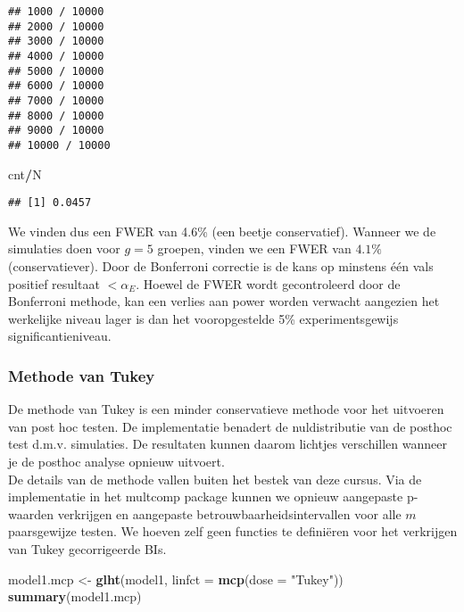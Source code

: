 \documentclass[
  12pt,dutch,coursenotes]{book}
\newenvironment{Shaded}{\begin{snugshade}}{\end{snugshade}}
\newcommand{\DataTypeTok}[1]{\textcolor[rgb]{0.13,0.29,0.53}{#1}}
\newcommand{\KeywordTok}[1]{\textcolor[rgb]{0.13,0.29,0.53}{\textbf{#1}}}
\newcommand{\NormalTok}[1]{#1}
\newcommand{\OperatorTok}[1]{\textcolor[rgb]{0.81,0.36,0.00}{\textbf{#1}}}
\newcommand{\StringTok}[1]{\textcolor[rgb]{0.31,0.60,0.02}{#1}}
\theoremstyle{definition}
\theoremstyle{definition}
\theoremstyle{definition}
\theoremstyle{remark}
\begin{document}
\begin{verbatim}
## 1000 / 10000 
## 2000 / 10000 
## 3000 / 10000 
## 4000 / 10000 
## 5000 / 10000 
## 6000 / 10000 
## 7000 / 10000 
## 8000 / 10000 
## 9000 / 10000 
## 10000 / 10000
\end{verbatim}

\begin{Shaded}
\begin{Highlighting}[]
\NormalTok{cnt}\OperatorTok{/}\NormalTok{N}
\end{Highlighting}
\end{Shaded}

\begin{verbatim}
## [1] 0.0457
\end{verbatim}

We vinden dus een FWER van 4.6\% (een beetje conservatief). Wanneer we de simulaties doen voor \(g=5\) groepen, vinden we een FWER van \(4.1\%\) (conservatiever). Door de Bonferroni correctie is de kans op minstens één vals positief resultaat \(< \alpha_E\). Hoewel de FWER wordt gecontroleerd door de Bonferroni methode, kan een verlies aan power worden verwacht aangezien het werkelijke niveau lager is dan het vooropgestelde 5\% experimentsgewijs significantieniveau.

\hypertarget{methode-van-tukey}{%
\subsubsection{Methode van Tukey}\label{methode-van-tukey}}

De methode van Tukey is een minder conservatieve methode voor het uitvoeren van post hoc testen.
De implementatie benadert de nuldistributie van de posthoc test d.m.v. simulaties.
De resultaten kunnen daarom lichtjes verschillen wanneer je de posthoc analyse opnieuw uitvoert.\\
De details van de methode vallen buiten het bestek van deze cursus.
Via de implementatie in het multcomp package kunnen we opnieuw aangepaste p-waarden verkrijgen en aangepaste betrouwbaarheidsintervallen voor alle \(m\) paarsgewijze testen.
We hoeven zelf geen functies te definiëren voor het verkrijgen van Tukey gecorrigeerde BIs.

\begin{Shaded}
\begin{Highlighting}[]
\NormalTok{model1.mcp \textless{}{-}}\StringTok{ }\KeywordTok{glht}\NormalTok{(model1, }\DataTypeTok{linfct =} \KeywordTok{mcp}\NormalTok{(}\DataTypeTok{dose =} \StringTok{"Tukey"}\NormalTok{))}
\KeywordTok{summary}\NormalTok{(model1.mcp)}
\end{Highlighting}
\end{Shaded}
\end{document}
